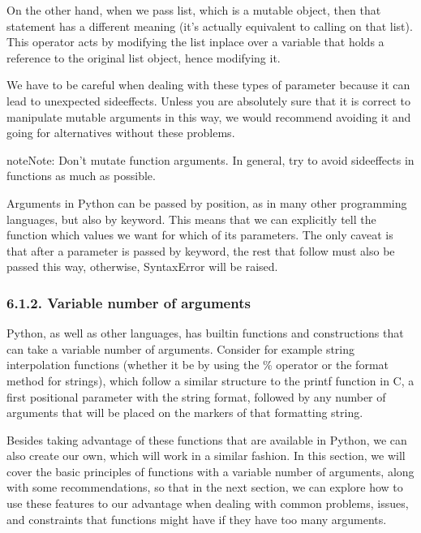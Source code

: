 \documentclass[a4paper,10pt,english]{sphinxmanual}
\begin{document}
On the other hand, when we pass list, which is a mutable object, then that statement has a different meaning
(it’s actually equivalent to calling  on that list). This operator acts by modifying the list
in\sphinxhyphen{}place over a variable that holds a reference to the original list object, hence modifying it.

We have to be careful when dealing with these types of parameter because it can lead to unexpected
side\sphinxhyphen{}effects. Unless you are absolutely sure that it is correct to manipulate mutable arguments in this way,
we would recommend avoiding it and going for alternatives without these problems.

\begin{sphinxadmonition}{note}{Note:}
Don’t mutate function arguments. In general, try to avoid side\sphinxhyphen{}effects in functions as much as possible.
\end{sphinxadmonition}

Arguments in Python can be passed by position, as in many other programming languages, but also by keyword.
This means that we can explicitly tell the function which values we want for which of its parameters. The only
caveat is that after a parameter is passed by keyword, the rest that follow must also be passed this way,
otherwise, SyntaxError will be raised.


\subsubsection{6.1.2. Variable number of arguments}
\label{\detokenize{chapters/3_general_traits/index:variable-number-of-arguments}}
Python, as well as other languages, has built\sphinxhyphen{}in functions and constructions that can take a variable number
of arguments. Consider for example string interpolation functions (whether it be by using the \% operator or
the format method for strings), which follow a similar structure to the printf function in C, a first
positional parameter with the string format, followed by any number of arguments that will be placed on the
markers of that formatting string.

Besides taking advantage of these functions that are available in Python, we can also create our own, which
will work in a similar fashion. In this section, we will cover the basic principles of functions with a
variable number of arguments, along with some recommendations, so that in the next section, we can explore how
to use these features to our advantage when dealing with common problems, issues, and constraints that
functions might have if they have too many arguments.
\end{document}
